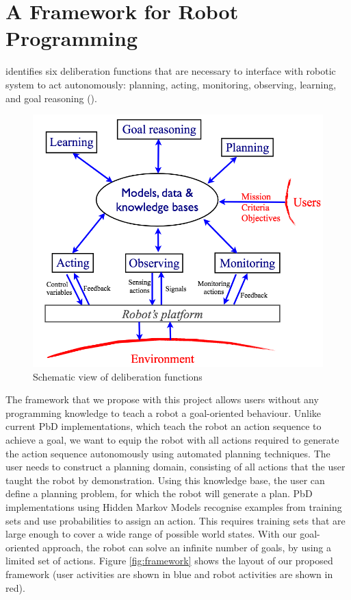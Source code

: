 \chapter{A Framework for Robot Programming}\label{sec:Contribution}

\cite{ingrand2017deliberation} identifies six deliberation functions that are necessary to interface with robotic system to act autonomously: planning, acting, monitoring, observing, learning, and goal reasoning ().

\begin{figure}[h]
	\centering
	\includegraphics[scale=0.50]{figures/deliberationfunctions}
	\caption{Schematic view of deliberation functions \cite{ingrand2017deliberation}}
	\label{fig:deliberationfunctions}
\end{figure}

The framework that we propose with this project allows users without any programming knowledge to teach a robot a goal-oriented behaviour. 
Unlike current PbD implementations, which teach the robot an action sequence to achieve a goal, we want to equip the robot with all actions required to generate the action sequence autonomously using automated planning techniques. The user needs to construct a planning domain, consisting of all actions that the user taught the robot by demonstration.
 Using this knowledge base, the user can define a planning problem, for which the robot will generate a plan.
 PbD implementations using Hidden Markov Models recognise examples from training sets and use probabilities to assign an action.
 This requires training sets that are large enough to cover a wide range of possible world states.
 With our goal-oriented approach, the robot can solve an infinite number of goals, by using a limited set of actions.
 Figure \ref{fig:framework} shows the layout of our proposed framework (user activities are shown in blue and robot activities are shown in red).
 

